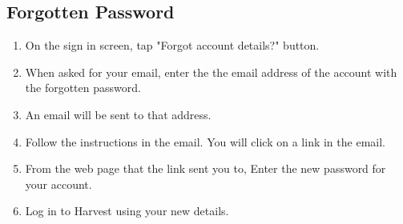 \documentclass[11pt]{article}
\begin{document}
\subsection{Forgotten Password}
\begin{enumerate}
\item On the sign in screen, tap "Forgot account details?" button.
\item When asked for your email, enter the the email address of the account with the forgotten password.
\item An email will be sent to that address.
\item Follow the instructions in the email. You will click on a link in the email.
\item From the web page that the link sent you to, Enter the new password for your account.
\item Log in to Harvest using your new details.
\end{enumerate}
\end{document}
